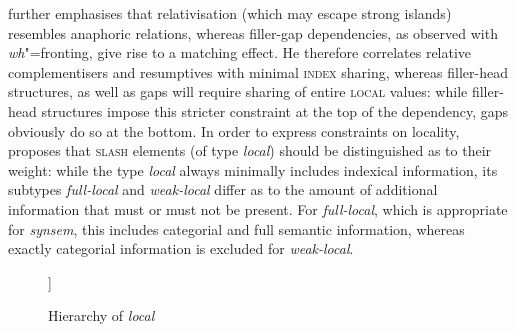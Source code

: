 \documentclass[output=paper
,notxmath 
 	        ,biblatex
                ,babelshorthands
                ,newtxmath
                ,draftmode
                ,colorlinks, citecolor=brown
]{langscibook}
\begin{document}
\noindent
\citet{Crysmann2012b-u} further emphasises that relativisation (which
may escape strong islands) resembles anaphoric relations, whereas
filler-gap dependencies, as observed with \emph{wh}"=fronting, give
rise to a matching effect. He therefore correlates relative
complementisers and resumptives with minimal \textsc{index} sharing,
whereas filler-head structures, as well as gaps will require sharing
of entire \textsc{local} values: while filler-head structures impose
this stricter constraint at the top of the dependency, gaps obviously
do so at the bottom. In order to express constraints on locality,
\citet{Crysmann:12,Crysmann:16} proposes that \textsc{slash} elements
(of type \textit{local}) should be distinguished as to their weight:
while the type \textit{local} always minimally includes indexical
information, its subtypes \textit{full-local} and \textit{weak-local}
differ as to the amount of additional information that must or must
not be present. For \textit{full-local}, which is appropriate for
\textit{synsem}, this includes categorial and full semantic
information, whereas exactly categorial information is excluded for
\textit{weak-local}.



%  
%
%
%
%



\begin{figure}
	\centering

\begin{forest}
[%
\avm{
	[\type*{local} 
	cont &	[index & ind ] ]
}%
	[%
	\avm{
		[\type*{full-local}
		cat & cat ]
	}]
	[%
	\avm{
		[\type*{weak-local}
		cont &	[rels <  > ] ]
	}]
]
\end{forest}  
  
\caption{\label{fig:local}Hierarchy of \textit{local} \citep[]{Crysmann:16}}
  
\end{figure}
\end{document}
